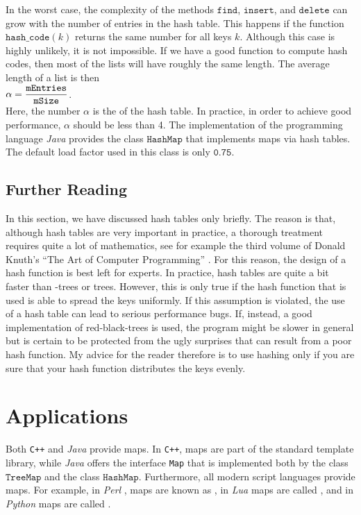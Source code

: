In the worst case, the complexity of
the methods  $\texttt{find}$, $\texttt{insert}$, and $\texttt{delete}$ can grow  with the number
of entries in the hash table.  This happens if the function 
$\texttt{hash\_code}(k)$ returns the same number for all keys $k$.  Although this case is
highly unlikely, it is not impossible.  If we have a good function to compute hash codes, then
most of the  lists will have roughly the same length.  The average length of a list is then
 \\[0.2cm]
\hspace*{1.3cm}
 $\alpha = \displaystyle \frac{\texttt{mEntries}}{\texttt{mSize}}$. 
\\[0.2cm]
Here, the number $\alpha$ is the  of the hash table.  In practice, in order to
achieve good performance, $\alpha$ should be less than 4.  The implementation of the programming
language \textsl{Java} provides the class  $\texttt{HashMap}$ that implements maps via hash tables.
The default load factor used in this class is only $\texttt{0.75}$.

\subsection{Further Reading}
In this section, we have discussed hash tables only briefly.  The reason is that, although hash tables are very
important in practice, a thorough treatment requires quite a lot of mathematics, see for example the
third volume of Donald Knuth's ``The Art of Computer Programming'' \cite{knuth:1998b}.  For this
reason, the design of a hash function is best left for experts.  In practice, hash tables are
quite a bit faster than -trees or  trees.  However, this is only true if
the hash function that is used is able to spread the keys uniformly.  If this assumption is
violated, the use of a hash table can lead to serious performance 
bugs.  If, instead, a good
implementation of red-black-trees is used, the program might be slower in general but is certain to
be protected from the ugly surprises that can result from a poor hash function.  My advice for the reader
therefore is to use hashing only if you are sure that your hash function distributes the keys evenly.


\section{Applications}
Both \texttt{C++} and \textsl{Java} provide maps.  In \texttt{C++}, maps are part of the standard
template library, while \textsl{Java} offers the interface \texttt{Map} that is implemented both by
the class $\texttt{TreeMap}$ and the class $\texttt{HashMap}$. Furthermore, all modern script languages provide maps.
For example, in \textsl{Perl} \cite{Wall92}, maps are known as , in \textsl{Lua} 
\cite{ierusalimschy:2006,Ieru96a} maps are called , and in \textsl{Python} 
\cite{vanRossum:95,lutz:09} maps are called .  

